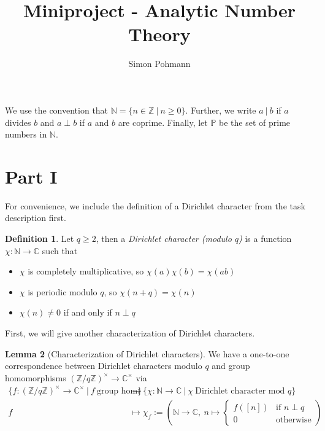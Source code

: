 \documentclass{scrartcl}
\title{Miniproject - Analytic Number Theory}
\author{Simon Pohmann}
\date{}
\newcommand{\primes}{\mathbb{P}}
\newcommand{\N}{\mathbb{N}}
\newcommand{\Z}{\mathbb{Z}}
\newcommand{\C}{\mathbb{C}}
\newcommand{\divides}{\ | \ }
\newcommand{\units}{\times}
\theoremstyle{definition}
\newtheorem{definition}{Definition}
\newtheorem{lemma}[definition]{Lemma}
\begin{document}
\maketitle
We use the convention that $\N = \{ n \in \Z \ | \ n \geq 0 \}$.
Further, we write $a \divides b$ if $a$ divides $b$ and $a \perp b$ if $a$ and $b$ are coprime.
Finally, let $\primes$ be the set of prime numbers in $\N$.

\section{Part I}

For convenience, we include the definition of a Dirichlet character from the task description first.
\begin{definition}
    Let $q \geq 2$, then a \emph{Dirichlet character (modulo $q$)} is a function $\chi: \N \to \C$ such that
    \begin{itemize}
        \item $\chi$ is completely multiplicative, so $\chi(a)\chi(b) = \chi(ab)$
        \item $\chi$ is periodic modulo $q$, so $\chi(n + q) = \chi(n)$
        \item $\chi(n) \neq 0$ if and only if $n \perp q$
    \end{itemize}
\end{definition}
First, we will give another characterization of Dirichlet characters.
\begin{lemma}[Characterization of Dirichlet characters]
    \label{prop:characterization_dirichlet_character}
    We have a one-to-one correspondence between Dirichlet characters modulo $q$ and group homomorphisms $(\Z/q\Z)^\units \to \C^\units$ via
    \begin{align*}
        \{ f: (\Z/q\Z)^\units \to \C^\units \ | \ f \ \text{group hom} \} &\to \{ \chi: \N \to \C \ | \ \chi \ \text{Dirichlet character mod $q$} \} \\
        f &\mapsto \chi_f := \left( \N \to \C, \ n \mapsto \begin{cases}
            f([n]) & \text{if $n \perp q$} \\
            0 & \text{otherwise}
        \end{cases} \right)
    \end{align*}
\end{lemma}
\end{document}
